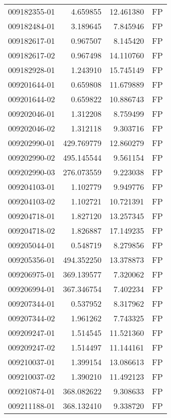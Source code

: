 \begin{tabular}{lrrl}
009182355-01 &    4.659855 &      12.461380 &   FP \\
009182484-01 &    3.189645 &       7.845946 &   FP \\
009182617-01 &    0.967507 &       8.145420 &   FP \\
009182617-02 &    0.967498 &      14.110760 &   FP \\
009182928-01 &    1.243910 &      15.745149 &   FP \\
009201644-01 &    0.659808 &      11.679889 &   FP \\
009201644-02 &    0.659822 &      10.886743 &   FP \\
009202046-01 &    1.312208 &       8.759499 &   FP \\
009202046-02 &    1.312118 &       9.303716 &   FP \\
009202990-01 &  429.769779 &      12.860279 &   FP \\
009202990-02 &  495.145544 &       9.561154 &   FP \\
009202990-03 &  276.073559 &       9.223038 &   FP \\
009204103-01 &    1.102779 &       9.949776 &   FP \\
009204103-02 &    1.102721 &      10.721391 &   FP \\
009204718-01 &    1.827120 &      13.257345 &   FP \\
009204718-02 &    1.826887 &      17.149235 &   FP \\
009205044-01 &    0.548719 &       8.279856 &   FP \\
009205356-01 &  494.352250 &      13.378873 &   FP \\
009206975-01 &  369.139577 &       7.320062 &   FP \\
009206994-01 &  367.346754 &       7.402234 &   FP \\
009207344-01 &    0.537952 &       8.317962 &   FP \\
009207344-02 &    1.961262 &       7.743325 &   FP \\
009209247-01 &    1.514545 &      11.521360 &   FP \\
009209247-02 &    1.514497 &      11.144161 &   FP \\
009210037-01 &    1.399154 &      13.086613 &   FP \\
009210037-02 &    1.390210 &      11.492123 &   FP \\
009210874-01 &  368.082622 &       9.308633 &   FP \\
009211188-01 &  368.132410 &       9.338720 &   FP \\

\end{tabular}
